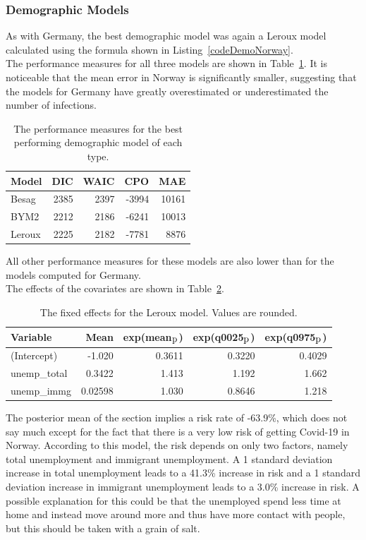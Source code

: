 \subsubsection{Demographic Models}
As with Germany, the best demographic model was again a Leroux model calculated using the formula shown in Listing~\ref{codeDemoNorway}. \\
The performance measures for all three models are shown in Table~\ref{demoNorway}. It is noticeable that the mean error in Norway is significantly smaller, suggesting that the models for Germany have greatly overestimated or underestimated the number of infections.
\begin{table}[H] 
\caption{The performance measures for the best performing demographic model of each type. \label{demoNorway}}
\begin{tabular}{l r r r r}
\toprule
\textbf{Model}	& \textbf{DIC}	& \textbf{WAIC} & \textbf{CPO} & \textbf{MAE}\\
\midrule
Besag  & 2385 & 2397 & -3994 & 10161 \\
BYM2 & 2212 & 2186 & -6241 & 10013\\
Leroux & 2225  & 2182 & -7781 & 8876\\
\bottomrule
\end{tabular}
\end{table}
All other performance measures for these models are also lower than for the models computed for Germany. \\
The effects of the covariates are shown in Table~\ref{fixedDemoNorway}.
\begin{table}[H] 
\caption{The fixed effects for the Leroux model. Values are rounded. \label{fixedDemoNorway}}
\begin{tabular}{l r r r r}
\toprule
\textbf{Variable}	& \textbf{Mean}	& \textbf{exp(mean$_{\hbox{p}}$)} & \textbf{exp(q0025$_{\hbox{p}}$)} & \textbf{exp(q0975$_{\hbox{p}}$)} \\
\midrule
(Intercept) & -1.020 & 0.3611 & 0.3220 & 0.4029 \\
unemp\_total & 0.3422 & 1.413 & 1.192 & 1.662 \\
unemp\_immg & 0.02598 & 1.030 & 0.8646 & 1.218 \\
\bottomrule
\end{tabular}
\end{table}
The posterior mean of the section implies a risk rate of -63.9\%, which does not say much except for the fact that there is a very low risk of getting Covid-19 in Norway. According to this model, the risk depends on only two factors, namely total unemployment and immigrant unemployment. A 1 standard deviation increase in total unemployment leads to a 41.3\% increase in risk and a 1 standard deviation increase in immigrant unemployment leads to a 3.0\% increase in risk. A possible explanation for this could be that the unemployed spend less time at home and instead move around more and thus have more contact with people, but this should be taken with a grain of salt.

